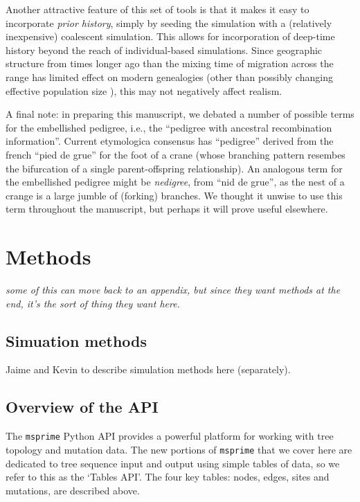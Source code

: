 \documentclass{article}
\newcommand{\msprime}{\texttt{msprime}}
\newcommand{\plr}[1]{{\em \color{blue} #1}}
\begin{document}
Another attractive feature of this set of tools
is that it makes it easy to incorporate \emph{prior history},
simply by seeding the simulation with a (relatively inexpensive) coalescent simulation.
This allows for incorporation of deep-time history beyond the reach of individual-based simulations. 
Since geographic structure from times longer ago than the mixing
time of migration across the range has limited effect on modern genealogies
\citep{wilkins2004separation} (other than possibly changing effective population
size \citet{barton2002neutral,cox2002stepping}), this may not negatively affect realism.


A final note:
in preparing this manuscript, 
we debated a number of possible terms for the embellished pedigree,
i.e., the ``pedigree with ancestral recombination information''.
Current etymologica consensus \citep{liberman2014little} has
``pedigree'' derived from the french ``pied de grue'' for the foot of a crane
(whose branching pattern resembes the bifurcation of a single parent-offspring relationship).
An analogous term for the embellished pedigree might be \emph{nedigree},
from ``nid de grue'',
as the nest of a crange is a large jumble of (forking) branches.
We thought it unwise to use this term throughout the manuscript,
but perhaps it will prove useful elsewhere.


\section*{Methods}

\plr{some of this can move back to an appendix, but since they want methods at the end,
it's the sort of thing they want here.}

\subsection*{Simuation methods}

Jaime and Kevin to describe simulation methods here (separately).

\subsection*{Overview of the API}

The \msprime{} Python API provides a powerful platform for working with tree topology and mutation data. 
The new portions of \msprime{} that we cover here
are dedicated to tree sequence input and output using simple tables of data,
so we refer to this as the `Tables API'.
The four key tables: nodes, edges, sites and mutations, are described above.
\end{document}
